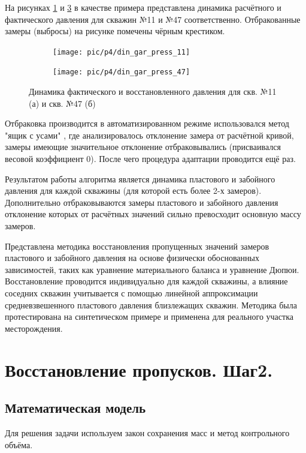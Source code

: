 \documentclass[14pt]{article}
\begin{document}
На рисунках \ref{fig:din_gar_press_11} и \ref{fig:din_gar_press_45} в качестве примера представлена динамика расчётного и фактического давления для скважин №11 и №47 соответственно. Отбракованные замеры (выбросы) на рисунке помечены чёрным крестиком. 
 \begin{figure}[!htb]
	\centering
	\begin{subfigure}[b]{0.9\linewidth}
	\texttt{[image: pic/p4/din\_gar\_press\_11]}
	\caption{}
	\label{fig:din_gar_press_11}
	\end{subfigure}
	\begin{subfigure}[b]{0.9\linewidth}
		\texttt{[image: pic/p4/din\_gar\_press\_47]}
		\caption{}
		\label{fig:din_gar_press_45}
	\end{subfigure}
		\caption{Динамика фактического и восстановленного давления для скв. №11 (а) и скв. №47 (б)}
\end{figure}
Отбраковка производится в автоматизированном режиме использовался метод "ящик с усами" \cite{BoxPlot}, где анализировалось отклонение замера от расчётной кривой, замеры имеющие значительное отклонение отбраковывались (присваивался весовой коэффициент 0). После чего процедура адаптации проводится ещё раз. 

Результатом работы алгоритма является динамика пластового и забойного давления для каждой скважины (для которой есть более 2-х замеров). Дополнительно отбраковываются замеры пластового и забойного давления отклонение которых от расчётных значений сильно превосходит основную массу замеров.

Представлена методика восстановления пропущенных значений замеров пластового и забойного давления на основе физически обоснованных зависимостей, таких как уравнение материального баланса и уравнение Дюпюи. Восстановление проводится индивидуально для каждой скважины, а влияние соседних скважин учитывается с помощью линейной аппроксимации средневзвешенного пластового давления близлежащих скважин. Методика была протестирована на синтетическом примере и применена для реального участка месторождения.

\section{Восстановление пропусков. Шаг2.}

\subsection{Математическая модель}
Для решения задачи используем закон сохранения масс и метод контрольного объёма. 
\end{document}
